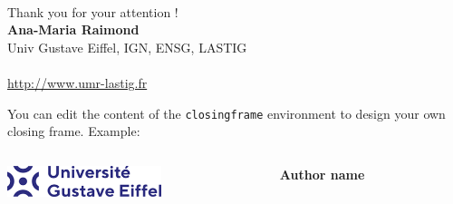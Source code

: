 \documentclass[11pt,aspectratio=169]{beamer}
\begin{document}
\begin{closingframe}

\Large{\textcolor{LASTIGBlue}{\insertshorttitle}}\\
\bigskip
\large{\textcolor{LASTIGRed}{Thank you for your attention !}}\\
\bigskip
\normalsize
\textbf{Ana-Maria Raimond}\\
Univ Gustave Eiffel, IGN, ENSG, LASTIG\\
\\
\url{http://www.umr-lastig.fr}

\end{closingframe}


\begin{closingframe}

	You can edit the content of the \texttt{closingframe} environment to design your own closing frame. Example:
	
	\vspace{15mm}

	\begin{columns}
		\begin{column}{0.55\textwidth}
			\raggedleft
			\includegraphics[width=45mm]{LASTIG_latex_template/elements/logo_uge} 
		\end{column}
		\begin{column}{0.4\textwidth}
			\textbf{Author name}\\
		\end{column}
	\end{columns}

	\vspace{20mm}
			
\end{closingframe}
\end{document}
